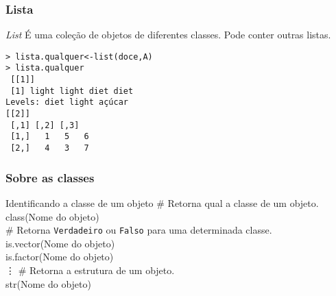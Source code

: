 \documentclass[handout]{beamer}
\begin{document}
  \begin{frame}
    \frametitle{Lista}
    \begin{block}{\textit{List}}
        É uma coleção de objetos de diferentes classes. Pode conter outras listas.     
    \end{block}
\texttt{> lista.qualquer<-list(doce,A)\\
  > lista.qualquer \\
 ~[[1]]\\
~[1] light light diet  diet \\
Levels: diet light açúcar\\
\vspace{10pt}
[[2]]\\
  \hspace{20pt} ~[,1]~[,2]~[,3]\\
~[1,]  ~  1  ~  5 ~   6\\
~[2,]  ~  4 ~   3  ~  7}
  \end{frame}
  \begin{frame}
    \frametitle{Sobre as classes}
    \begin{block}{Identificando a classe de um objeto}
      \# Retorna qual a classe de um objeto.\\
      class(Nome do objeto)\\ \vspace{10pt}
      \# Retorna \texttt{Verdadeiro} ou \texttt{Falso} para uma determinada classe. \\
       is.vector(Nome do objeto)\\
       is.factor(Nome do objeto)\\
        \vdots 
         \vspace{10pt}
        \# Retorna a estrutura de um objeto.\\
         str(Nome do objeto)
    \end{block}
  \end{frame}
\end{document}
